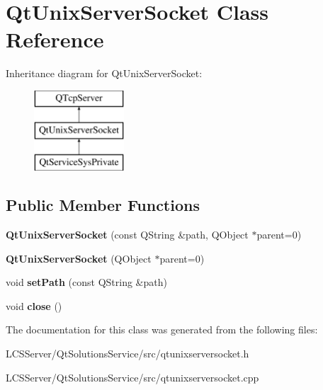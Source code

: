 \hypertarget{class_qt_unix_server_socket}{}\section{Qt\+Unix\+Server\+Socket Class Reference}
\label{class_qt_unix_server_socket}
Inheritance diagram for Qt\+Unix\+Server\+Socket\+:\begin{figure}[H]
\begin{center}
\leavevmode
\includegraphics[height=3.000000cm]{class_qt_unix_server_socket}
\end{center}
\end{figure}
\subsection*{Public Member Functions}
\begin{DoxyCompactItemize}
\item 
\mbox{\label{class_qt_unix_server_socket_a9b6133aa5f66a9acf58529cdf865efe4}} 
{\bfseries Qt\+Unix\+Server\+Socket} (const Q\+String \&path, Q\+Object $\ast$parent=0)
\item 
\mbox{\label{class_qt_unix_server_socket_aa73dd123bc2ff7a7a90eb408fce90194}} 
{\bfseries Qt\+Unix\+Server\+Socket} (Q\+Object $\ast$parent=0)
\item 
\mbox{\label{class_qt_unix_server_socket_a733cf66cddbbf31d8a37675f349d2ca8}} 
void {\bfseries set\+Path} (const Q\+String \&path)
\item 
\mbox{\label{class_qt_unix_server_socket_a74bdb3e24b99bb55d7101651a2e86205}} 
void {\bfseries close} ()
\end{DoxyCompactItemize}


The documentation for this class was generated from the following files\+:\begin{DoxyCompactItemize}
\item 
L\+C\+S\+Server/\+Qt\+Solutions\+Service/src/qtunixserversocket.\+h\item 
L\+C\+S\+Server/\+Qt\+Solutions\+Service/src/qtunixserversocket.\+cpp\end{DoxyCompactItemize}
